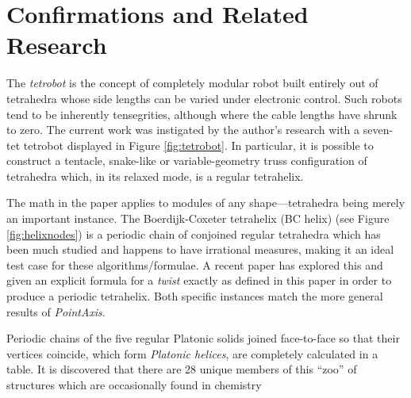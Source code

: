 \documentclass{svproc}
\begin{document}
\section{Confirmations and Related Research}

The {\em tetrobot}\cite{TetrobotBook} is the concept of completely
modular robot built entirely out of tetrahedra whose side lengths can
be varied under electronic control. Such robots tend to be inherently
tensegrities\cite{NTRT}, although where the cable lengths
have shrunk to zero.
The current work was instigated by the author's research with a seven-tet tetrobot
displayed in Figure
\ref{fig:tetrobot}.
In particular, it is possible to construct a tentacle, snake-like or
variable-geometry truss configuration of tetrahedra which, in its relaxed
mode, is a regular tetrahelix.

The math in the paper applies to modules of any shape---tetrahedra being
merely an important instance.
The Boerdijk-Coxeter tetrahelix (BC helix) (see Figure \ref{fig:helixnodes}) is a periodic chain of conjoined regular tetrahedra
which has been much studied\cite{coxeter1985simplicial,sadler2019periodic,fuller1982synergetics,read2018transforming}
and happens to have irrational measures, making it an ideal
test case for these algorithms/formulae. A recent paper\cite{sadler2019periodic} has explored this
and given an explicit formula for a {\em twist} exactly as defined in this
paper in order to produce a periodic tetrahelix. Both specific instances match the more general results of {\em PointAxis}.

Periodic chains of the five regular Platonic solids joined face-to-face so that their vertices coincide,
which form {\em Platonic helices}\cite{elgersma2016quadrahelix,lord2001sphere}, are completely calculated in a table\cite{readfullsegmentedhelix}.
It is discovered that there are 28 unique members of this ``zoo'' of structures which are occasionally found in chemistry\cite{lord2004gamma,pearce1990structure}






\appendix
\end{document}

